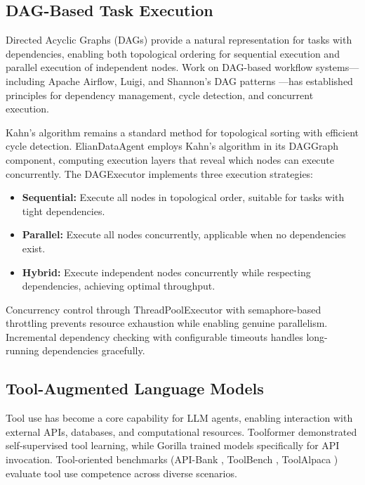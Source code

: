 \documentclass{article}
\theoremstyle{definition}
\begin{document}
\subsection{DAG-Based Task Execution}

Directed Acyclic Graphs (DAGs) provide a natural representation for tasks with dependencies, enabling both topological ordering for sequential execution and parallel execution of independent nodes. Work on DAG-based workflow systems---including Apache Airflow, Luigi, and Shannon's DAG patterns \cite{shannon2024dag}---has established principles for dependency management, cycle detection, and concurrent execution.

Kahn's algorithm \cite{kahn1962topological} remains a standard method for topological sorting with efficient cycle detection. ElianDataAgent employs Kahn's algorithm in its DAGGraph component, computing execution layers that reveal which nodes can execute concurrently. The DAGExecutor implements three execution strategies:
\begin{itemize}[leftmargin=1.5em]
    \item \textbf{Sequential:} Execute all nodes in topological order, suitable for tasks with tight dependencies.
    \item \textbf{Parallel:} Execute all nodes concurrently, applicable when no dependencies exist.
    \item \textbf{Hybrid:} Execute independent nodes concurrently while respecting dependencies, achieving optimal throughput.
\end{itemize}

Concurrency control through ThreadPoolExecutor with semaphore-based throttling prevents resource exhaustion while enabling genuine parallelism. Incremental dependency checking with configurable timeouts handles long-running dependencies gracefully.

\subsection{Tool-Augmented Language Models}

Tool use has become a core capability for LLM agents, enabling interaction with external APIs, databases, and computational resources. Toolformer \cite{schick2023toolformer} demonstrated self-supervised tool learning, while Gorilla \cite{patil2024gorilla} trained models specifically for API invocation. Tool-oriented benchmarks (API-Bank \cite{li2023api}, ToolBench \cite{qintoolllm}, ToolAlpaca \cite{tang2023toolalpaca}) evaluate tool use competence across diverse scenarios.
\end{document}
